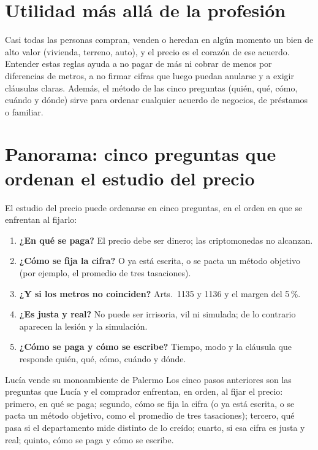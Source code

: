 \documentclass[12pt,oneside]{book}
\begin{document}
\section{Utilidad m\'as all\'a de la profesi\'on}

Casi todas las personas compran, venden o heredan en alg\'un momento un bien de alto valor (vivienda, terreno, auto), y el precio es el coraz\'on de ese acuerdo. Entender estas reglas ayuda a no pagar de m\'as ni cobrar de menos por diferencias de metros, a no firmar cifras que luego puedan anularse y a exigir cl\'ausulas claras. Adem\'as, el m\'etodo de las cinco preguntas (qui\'en, qu\'e, c\'omo, cu\'ando y d\'onde) sirve para ordenar cualquier acuerdo de negocios, de pr\'estamos o familiar.

\section{Panorama: cinco preguntas que ordenan el estudio del precio}

El estudio del precio puede ordenarse en cinco preguntas, en el orden en que se enfrentan al fijarlo:

\begin{enumerate}
    \item \textbf{¿En qu\'e se paga?} El precio debe ser dinero; las criptomonedas no alcanzan.
    \item \textbf{¿C\'omo se fija la cifra?} O ya est\'a escrita, o se pacta un m\'etodo objetivo (por ejemplo, el promedio de tres tasaciones).
    \item \textbf{¿Y si los metros no coinciden?} Arts.~1135 y 1136 y el margen del 5\,\%.
    \item \textbf{¿Es justa y real?} No puede ser irrisoria, vil ni simulada; de lo contrario aparecen la lesi\'on y la simulaci\'on.
    \item \textbf{¿C\'omo se paga y c\'omo se escribe?} Tiempo, modo y la cl\'ausula que responde qui\'en, qu\'e, c\'omo, cu\'ando y d\'onde.
\end{enumerate}

\begin{example}{Luc\'ia vende su monoambiente de Palermo}
Los cinco pasos anteriores son las preguntas que Luc\'ia y el comprador enfrentan, en orden, al fijar el precio: primero, en qu\'e se paga; segundo, c\'omo se fija la cifra (o ya est\'a escrita, o se pacta un m\'etodo objetivo, como el promedio de tres tasaciones); tercero, qu\'e pasa si el departamento mide distinto de lo creído; cuarto, si esa cifra es justa y real; quinto, c\'omo se paga y c\'omo se escribe.
\end{example}
\end{document}
